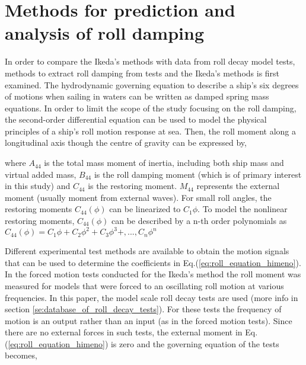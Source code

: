 \section{Methods for prediction and analysis of roll damping}
\label{se:methods_for_prediction_and_analysis}
In order to compare the Ikeda's methods with data from roll decay model tests, methods to extract roll damping from tests and the Ikeda's methods is first examined.
The hydrodynamic governing equation to describe a ship's six degrees of motions when sailing in waters can be written as damped spring mass equations. In order to limit the scope of the study focusing on the roll damping, the second-order differential equation can be used to model the physical principles of a ship's roll motion response at sea. Then, the roll moment along a longitudinal axis though the centre of gravity can be expressed by,

 

where $A_{44}$ is the total mass moment of inertia, including both ship mass and virtual added mass, $B_{44}$ is the roll damping moment (which is of primary interest in this study) and $C_{44}$ is the restoring moment. $M_{44}$ represents the external moment (usually moment from external waves). For small roll angles, the restoring moments $C_{44}(\phi)$ can be linearized to $C_{1}\phi$. To model the nonlinear restoring moments, $C_{44}(\phi)$ can be described by a n-th order polynomials as $C_{44}(\phi) = C_{1}\phi + C_{2}\phi^2 + C_{3}\phi^3 +, ..., C_{n}\phi^n $

Different experimental test methods are available to obtain the motion signals that can be used to determine the coefficients in Eq.(\ref{eq:roll_equation_himeno}). In the forced motion tests conducted for the Ikeda's method the roll moment was measured for models that were forced to an oscillating roll motion at various frequencies. In this paper, the model scale roll decay tests are used (more info in section \ref{se:database_of_roll_decay_tests}). For these tests the frequency of motion is an output rather than an input (as in the forced motion tests).  Since there are no external forces in such tests, the external moment in Eq.(\ref{eq:roll_equation_himeno}) is zero and the governing equation of the tests becomes, 





